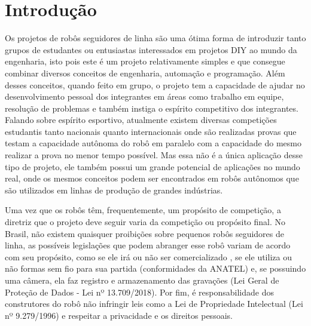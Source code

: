 \documentclass[
  12pt, %
  openright, %
  twoside, %
  a4paper, %
  english, %
  french, %
  spanish, %
  brazil %
]{abntex2}
\begin{document}
%
%
\tableofcontents*
\cleardoublepage

%
%
\textual

%
%
\chapter{Introdução}

Os projetos de robôs seguidores de linha são uma ótima forma de introduzir tanto
grupos de estudantes ou entusiastas interessados em projetos DIY ao mundo da
engenharia, isto pois este é um projeto relativamente simples e que consegue
combinar diversos conceitos de engenharia, automação e programação. Além desses
conceitos, quando feito em grupo, o projeto tem a capacidade de ajudar no
desenvolvimento pessoal dos integrantes em áreas como trabalho em equipe,
resolução de problemas e também instiga o espírito competitivo dos integrantes.
Falando sobre espírito esportivo, atualmente existem diversas competições
estudantis tanto nacionais quanto internacionais onde são realizadas provas que
testam a capacidade autônoma do robô em paralelo com a capacidade do mesmo
realizar a prova no menor tempo possível. Mas essa não é a única aplicação desse
tipo de projeto, ele também possui um grande potencial de aplicações no mundo
real, onde os mesmos conceitos podem ser encontrados em robôs autônomos que são
utilizados em linhas de produção de grandes indústrias.

Uma vez que os robôs têm, frequentemente, um propósito de competição, a diretriz
que o projeto deve seguir varia da competição ou propósito final. No Brasil, não
existem quaisquer proibições sobre pequenos robôs seguidores de linha, as
possíveis legislações que podem abranger esse robô variam de acordo com seu
propósito, como se ele irá ou não ser comercializado \cite{Lei:8078:1990}, se
ele utiliza ou não formas sem fio para sua partida (conformidades da ANATEL) e,
se possuindo uma câmera, ela faz registro e armazenamento das gravações (Lei
Geral de Proteção de Dados - Lei nº 13.709/2018). Por fim, é responsabilidade
dos construtores do robô não infringir leis como a Lei de Propriedade
Intelectual (Lei nº 9.279/1996) e respeitar a privacidade e os direitos
pessoais.

% 
%

\end{document}
